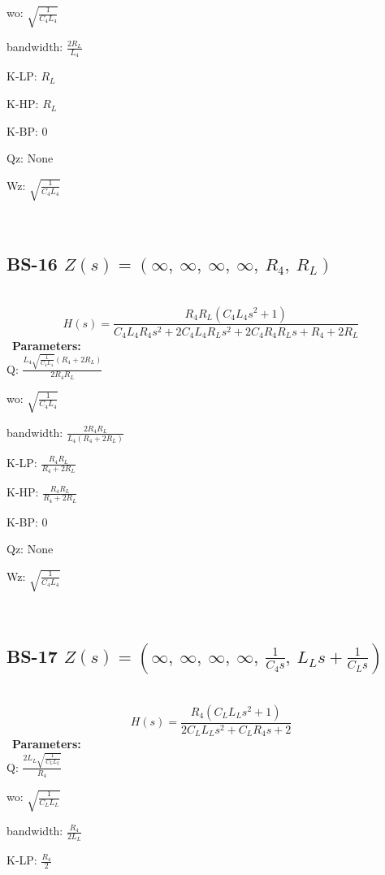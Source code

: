 \documentclass{article}
\begin{document}
wo: $\sqrt{\frac{1}{C_{4} L_{4}}}$\ 

bandwidth: $\frac{2 R_{L}}{L_{4}}$\ 

K-LP: $R_{L}$\ 

K-HP: $R_{L}$\ 

K-BP: $0$\ 

Qz: $\text{None}$\ 

Wz: $\sqrt{\frac{1}{C_{4} L_{4}}}$\ 

\ 

\subsection{BS-16 $Z(s) = \left( \infty, \  \infty, \  \infty, \  \infty, \  R_{4}, \  R_{L}\right)$ } \ 
\textbf{\[H(s) = \frac{R_{4} R_{L} \left(C_{4} L_{4} s^{2} + 1\right)}{C_{4} L_{4} R_{4} s^{2} + 2 C_{4} L_{4} R_{L} s^{2} + 2 C_{4} R_{4} R_{L} s + R_{4} + 2 R_{L}}\] } \ 
\textbf{Parameters:}\\ 

Q: $\frac{L_{4} \sqrt{\frac{1}{C_{4} L_{4}}} \left(R_{4} + 2 R_{L}\right)}{2 R_{4} R_{L}}$\ 

wo: $\sqrt{\frac{1}{C_{4} L_{4}}}$\ 

bandwidth: $\frac{2 R_{4} R_{L}}{L_{4} \left(R_{4} + 2 R_{L}\right)}$\ 

K-LP: $\frac{R_{4} R_{L}}{R_{4} + 2 R_{L}}$\ 

K-HP: $\frac{R_{4} R_{L}}{R_{4} + 2 R_{L}}$\ 

K-BP: $0$\ 

Qz: $\text{None}$\ 

Wz: $\sqrt{\frac{1}{C_{4} L_{4}}}$\ 

\ 

\subsection{BS-17 $Z(s) = \left( \infty, \  \infty, \  \infty, \  \infty, \  \frac{1}{C_{4} s}, \  L_{L} s + \frac{1}{C_{L} s}\right)$ } \ 
\textbf{\[H(s) = \frac{R_{4} \left(C_{L} L_{L} s^{2} + 1\right)}{2 C_{L} L_{L} s^{2} + C_{L} R_{4} s + 2}\] } \ 
\textbf{Parameters:}\\ 

Q: $\frac{2 L_{L} \sqrt{\frac{1}{C_{L} L_{L}}}}{R_{4}}$\ 

wo: $\sqrt{\frac{1}{C_{L} L_{L}}}$\ 

bandwidth: $\frac{R_{4}}{2 L_{L}}$\ 

K-LP: $\frac{R_{4}}{2}$\ 
\end{document}

